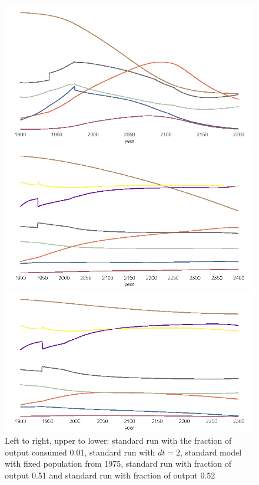 \documentclass[10pt,a4paper]{scrartcl}
\begin{document}
\begin{figure}
\begin{minipage}{0.49\textwidth}
\end{minipage}
\begin{minipage}{0.49\textwidth}
\includegraphics[width=\textwidth]{./plaatjes/three-vars.png}
\end{minipage}
\begin{minipage}{0.49\textwidth}
\includegraphics[width=\textwidth]{./plaatjes/output-consumed-0,51.png}
\end{minipage}
\begin{minipage}{0.49\textwidth}
\includegraphics[width=\textwidth]{./plaatjes/output-consumed-0,52.png}
\end{minipage}
\caption{Left to right, upper to lower: standard run with the fraction of output consumed 0.01, standard run with $dt=2$, standard model with fixed population from 1975, standard run with fraction of output 0.51 and standard run with fraction of output 0.52}
\label{composition}
\end{figure}
\end{document}
